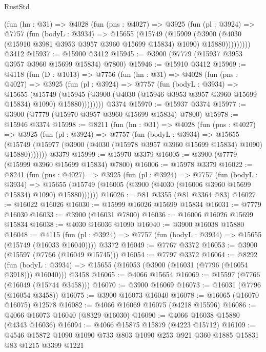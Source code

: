 \begin{lexlean}{RustStd}
\begin{coremodule}
        (fun (hn : @31) =>
        @4028
          (fun (pns : @4027) =>
          @3925
            (fun (pl : @3924) =>
            @7757
              (fun (bodyL : @3934) =>
              @15655
                (@15749
                  (@15909
                    (@3900
                      (@4030 (@15910 @3981 @3953 @3957 @3960 @15699 @15834) @1090)
                      @15880)))))))))
    @3412
@15937 := @15900 @3412
@15945 := @3900 (@7779 (@15937 @3953 @3957 @3960 @15699 @15834) @7800)
@15946 := @15910 @3412
@15969 := @4118
    (fun (D : @1013) =>
    @7756
      (fun (hn : @31) =>
      @4028
        (fun (pns : @4027) =>
        @3925
          (fun (pl : @3924) =>
          @7757
            (fun (bodyL : @3934) =>
            @15655
              (@15749
                (@15945 (@3900 (@4030 (@15946 @3953 @3957 @3960 @15699 @15834) @1090) @15880))))))))
    @3374
@15970 := @15937 @3374
@15977 := @3900 (@7779 (@15970 @3957 @3960 @15699 @15834) @7800)
@15978 := @15946 @3374
@15998 := @8211
    (fun (hn : @31) =>
    @4028
      (fun (pns : @4027) =>
      @3925
        (fun (pl : @3924) =>
        @7757
          (fun (bodyL : @3934) =>
          @15655
            (@15749 (@15977 (@3900 (@4030 (@15978 @3957 @3960 @15699 @15834) @1090) @15880)))))))
    @3379
@15999 := @15970 @3379
@16005 := @3900 (@7779 (@15999 @3960 @15699 @15834) @7800)
@16006 := @15978 @3379
@16022 := @8241
    (fun (pns : @4027) =>
    @3925
      (fun (pl : @3924) =>
      @7757
        (fun (bodyL : @3934) =>
        @15655 (@15749 (@16005 (@3900 (@4030 (@16006 @3960 @15699 @15834) @1090) @15880))))))
@16026 := @81 @3355 (@81 @3364 @83)
@16027 := @16022 @16026
@16030 := @15999 @16026 @15699 @15834
@16031 := @7779 @16030
@16033 := @3900 (@16031 @7800)
@16036 := @16006 @16026 @15699 @15834
@16038 := @4030 @16036 @1090
@16040 := @3900 @16038 @15880
@16048 := @4115
    (fun (pl : @3924) => @7757 (fun (bodyL : @3934) => @15655 (@15749 (@16033 @16040))))
    @3372
@16049 := @7767 @3372
@16053 := @3900 (@15597 (@7766 (@16049 @15745)))
@16054 := @7797 @3372
@16064 := @8292
    (fun (bodyL : @3934) => @15655 (@16053 (@3900 (@16031 (@7796 (@16054 @3918))) @16040)))
    @3458
@16065 := @4066 @15654
@16069 := @15597 (@7766 (@16049 (@15744 @3458)))
@16070 := @3900 @16069
@16073 := @16031 (@7796 (@16054 @3458))
@16075 := @3900 @16073 @16040
@16078 := @16065 (@16070 @16075) @12578
@16082 := @4066 @16069 @16075 (@4218 @15596)
@16086 := @4066 @16073 @16040 (@8329 @16030)
@16090 := @4066 @16038 @15880 (@4343 @16036)
@16094 := @4066 @15875 @15879 (@4223 @15712)
@16109 := @4546 @15872 @1090 @1090 @733 @803 @1090 @253 @921 @360 @1885 @15831 @83 @1215 @3399 @1221

\end{coremodule}
\end{lexlean}
